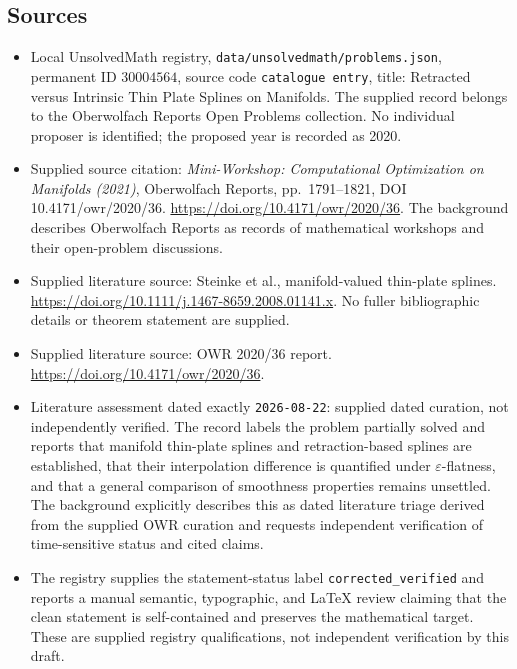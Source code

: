 \documentclass[11pt]{article}
\begin{document}
\subsection{Sources}
\begin{itemize}
\item Local UnsolvedMath registry, \texttt{data/unsolvedmath/problems.json}, permanent ID \(30004564\), source code \texttt{catalogue entry}, title: Retracted versus Intrinsic Thin Plate Splines on Manifolds. The supplied record belongs to the Oberwolfach Reports Open Problems collection. No individual proposer is identified; the proposed year is recorded as 2020.
\item Supplied source citation: \emph{Mini-Workshop: Computational Optimization on Manifolds (2021)}, Oberwolfach Reports, pp.\ 1791--1821, DOI 10.4171/owr/2020/36. \url{https://doi.org/10.4171/owr/2020/36}. The background describes Oberwolfach Reports as records of mathematical workshops and their open-problem discussions.
\item Supplied literature source: Steinke et al., manifold-valued thin-plate splines. \url{https://doi.org/10.1111/j.1467-8659.2008.01141.x}. No fuller bibliographic details or theorem statement are supplied.
\item Supplied literature source: OWR 2020/36 report. \url{https://doi.org/10.4171/owr/2020/36}.
\item Literature assessment dated exactly \texttt{2026-08-22}: supplied dated curation, not independently verified. The record labels the problem partially solved and reports that manifold thin-plate splines and retraction-based splines are established, that their interpolation difference is quantified under \(\varepsilon\)-flatness, and that a general comparison of smoothness properties remains unsettled. The background explicitly describes this as dated literature triage derived from the supplied OWR curation and requests independent verification of time-sensitive status and cited claims.
\item The registry supplies the statement-status label \texttt{corrected\_verified} and reports a manual semantic, typographic, and LaTeX review claiming that the clean statement is self-contained and preserves the mathematical target. These are supplied registry qualifications, not independent verification by this draft.
\end{itemize}
\end{document}
